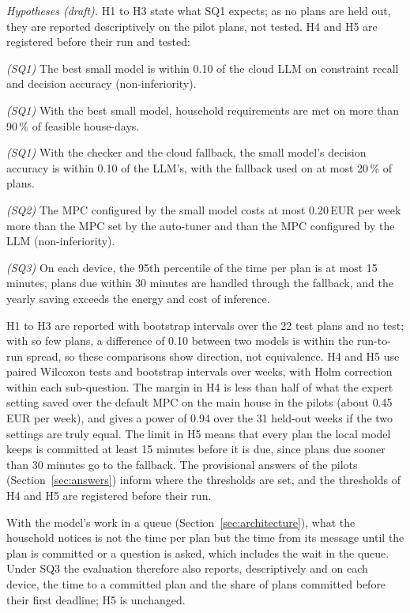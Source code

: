 \textit{Hypotheses (draft).} H1 to H3 state what SQ1 expects; as no
plans are held out, they are reported descriptively on the pilot plans,
not tested. H4 and H5 are registered before their run and tested:

\begin{description}[leftmargin=1.4cm, style=sameline, font=\normalfont\bfseries]
\item[H1] \textit{(SQ1)} The best small model is within 0.10 of the
cloud LLM on constraint recall and decision accuracy
(non-inferiority).
\item[H2] \textit{(SQ1)} With the best small model, household
requirements are met on more than 90\,\% of feasible house-days.
\item[H3] \textit{(SQ1)} With the checker and the cloud fallback, the
small model's decision accuracy is within 0.10 of the LLM's, with the
fallback used on at most 20\,\% of plans.
\item[H4] \textit{(SQ2)} The MPC configured by the small model costs at
most 0.20\,EUR per week more than the MPC set by the auto-tuner and
than the MPC configured by the LLM (non-inferiority).
\item[H5] \textit{(SQ3)} On each device, the 95th percentile of the
time per plan is at most 15 minutes, plans due within 30 minutes are
handled through the fallback, and the yearly saving exceeds the energy
and cost of inference.
\end{description}

H1 to H3 are reported with bootstrap intervals over the 22 test plans
and no test; with so few plans, a difference of 0.10 between two models
is within the run-to-run spread, so these comparisons show direction,
not equivalence. H4 and H5 use paired Wilcoxon tests and bootstrap
intervals over weeks, with Holm correction within each sub-question. The margin in H4 is less than half of
what the expert setting saved over the default MPC on the main house in
the pilots (about 0.45\,EUR per week), and gives a power of 0.94 over
the 31 held-out weeks if the two settings are truly equal. The limit in
H5 means that every plan the local model keeps is committed at least
15 minutes before it is due, since plans due sooner than 30 minutes go
to the fallback. The provisional
answers of the pilots (Section~\ref{sec:answers}) inform where the
thresholds are set, and the thresholds of H4 and H5 are registered
before their run.

With the model's work in a queue (Section~\ref{sec:architecture}), what
the household notices is not the time per plan but the time from its
message until the plan is committed or a question is asked, which
includes the wait in the queue. Under SQ3 the evaluation therefore also
reports, descriptively and on each device, the time to a committed plan
and the share of plans committed before their first deadline; H5 is
unchanged.

